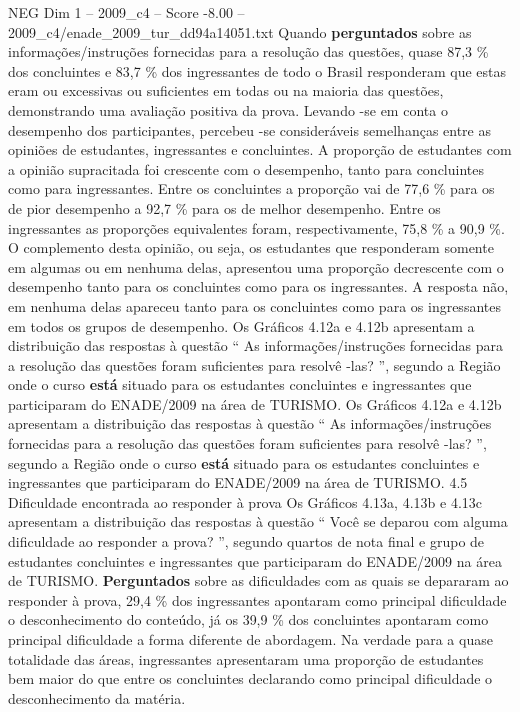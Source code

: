 \begin{textsample}{NEG Dim 1 – 2009\_c4 – Score -8.00 – 2009\_c4/enade\_2009\_tur\_dd94a14051.txt}
Quando \textbf{perguntados} sobre as informações/instruções fornecidas para a resolução das questões, quase 87,3 \% dos concluintes e 83,7 \% dos ingressantes de todo o Brasil responderam que estas eram ou excessivas ou suficientes em todas ou na maioria das questões, demonstrando uma avaliação positiva da prova.
Levando -se em conta o desempenho dos participantes, percebeu -se consideráveis semelhanças entre as opiniões de estudantes, ingressantes e concluintes.
A proporção de estudantes com a opinião supracitada foi crescente com o desempenho, tanto para concluintes como para ingressantes.
Entre os concluintes a proporção vai de 77,6 \% para os de pior desempenho a 92,7 \% para os de melhor desempenho.
Entre os ingressantes as proporções equivalentes foram, respectivamente, 75,8 \% a 90,9 \%.
O complemento desta opinião, ou seja, os estudantes que responderam somente em algumas ou em nenhuma delas, apresentou uma proporção decrescente com o desempenho tanto para os concluintes como para os ingressantes.
A resposta não, em nenhuma delas apareceu tanto para os concluintes como para os ingressantes em todos os grupos de desempenho.
Os Gráficos 4.12a e 4.12b apresentam a distribuição das respostas à questão “ As informações/instruções fornecidas para a resolução das questões foram suficientes para resolvê -las? ”, segundo a Região onde o curso \textbf{está} situado para os estudantes concluintes e ingressantes que participaram do ENADE/2009 na área de TURISMO.
Os Gráficos 4.12a e 4.12b apresentam a distribuição das respostas à questão “ As informações/instruções fornecidas para a resolução das questões foram suficientes para resolvê -las? ”, segundo a Região onde o curso \textbf{está} situado para os estudantes concluintes e ingressantes que participaram do ENADE/2009 na área de TURISMO. 4.5 Dificuldade encontrada ao responder à prova Os Gráficos 4.13a, 4.13b e 4.13c apresentam a distribuição das respostas à questão “ Você se deparou com alguma dificuldade ao responder a prova? ”, segundo quartos de nota final e grupo de estudantes concluintes e ingressantes que participaram do ENADE/2009 na área de TURISMO. \textbf{Perguntados} sobre as dificuldades com as quais se depararam ao responder à prova, 29,4 \% dos ingressantes apontaram como principal dificuldade o desconhecimento do conteúdo, já os 39,9 \% dos concluintes apontaram como principal dificuldade a forma diferente de abordagem.
Na verdade para a quase totalidade das áreas, ingressantes apresentaram uma proporção de estudantes bem maior do que entre os concluintes declarando como principal dificuldade o desconhecimento da matéria.

\end{textsample}
